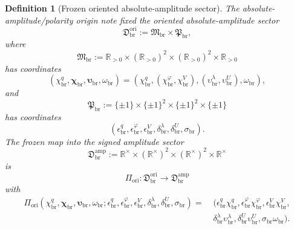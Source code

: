 \documentclass[11pt]{article}
\newcommand{\LiftSector}{\mathfrak D_{\mathrm{br}}^{\mathrm{amp}}}
\newcommand{\OriginSector}{\mathfrak D_{\mathrm{br}}^{\mathrm{ori}}}
\newcommand{\AbsAmpSector}{\mathfrak M_{\mathrm{br}}}
\newcommand{\PolaritySector}{\mathfrak P_{\mathrm{br}}}
\newcommand{\AbsReadAmp}{\chi_{\mathrm{br}}^{q}}
\newcommand{\AbsCovAmp}{\chi_{\mathrm{br}}^{\varphi}}
\newcommand{\AbsRelaxAmp}{\chi_{\mathrm{br}}^{V}}
\newcommand{\AbsKinAmp}{\bm\chi_{\mathrm{br}}}
\newcommand{\AbsWellAmp}{\upsilon_{\mathrm{br}}^{\lambda}}
\newcommand{\AbsEqAmp}{\upsilon_{\mathrm{br}}^{U}}
\newcommand{\AbsAnchorAmp}{\bm\upsilon_{\mathrm{br}}}
\newcommand{\AbsScaleAmp}{\omega_{\mathrm{br}}}
\newcommand{\PolRead}{\epsilon_{\mathrm{br}}^{q}}
\newcommand{\PolCov}{\epsilon_{\mathrm{br}}^{\varphi}}
\newcommand{\PolRelax}{\epsilon_{\mathrm{br}}^{V}}
\newcommand{\PolWell}{\delta_{\mathrm{br}}^{\lambda}}
\newcommand{\PolEq}{\delta_{\mathrm{br}}^{U}}
\newcommand{\PolScale}{\sigma_{\mathrm{br}}}
\newcommand{\OriginMap}{\Pi_{\mathrm{ori}}}
\newcommand{\Rstar}{\mathbb R^{\times}}
\newtheorem{definition}{Definition}
\begin{document}
\begin{definition}[Frozen oriented absolute-amplitude sector]
\label{def:frozenorigin}
The absolute-amplitude/polarity origin note fixed the oriented absolute-amplitude sector
\begin{equation}
\OriginSector
:=
\AbsAmpSector\times\PolaritySector,
\label{eq:originsector}
\end{equation}
where
\begin{equation}
\AbsAmpSector
:=
\mathbb R_{>0}\times(\mathbb R_{>0})^{2}\times(\mathbb R_{>0})^{2}\times\mathbb R_{>0}
\label{eq:abssector}
\end{equation}
has coordinates
\begin{equation}
(\AbsReadAmp,\AbsKinAmp,\AbsAnchorAmp,\AbsScaleAmp)
=
(\AbsReadAmp,(\AbsCovAmp,\AbsRelaxAmp),(\AbsWellAmp,\AbsEqAmp),\AbsScaleAmp),
\label{eq:abscoords}
\end{equation}
and
\begin{equation}
\PolaritySector
:=
\{\pm1\}\times\{\pm1\}^{2}\times\{\pm1\}^{2}\times\{\pm1\}
\label{eq:polsector}
\end{equation}
has coordinates
\begin{equation}
(\PolRead,\PolCov,\PolRelax,\PolWell,\PolEq,\PolScale).
\label{eq:polcoords}
\end{equation}
The frozen map into the signed amplitude sector
\begin{equation}
\LiftSector
:=
\Rstar\times(\Rstar)^{2}\times(\Rstar)^{2}\times\Rstar
\label{eq:liftsector}
\end{equation}
is
\begin{equation}
\OriginMap:\OriginSector\longrightarrow\LiftSector
\label{eq:originmap}
\end{equation}
with
\begin{align}
\OriginMap(\AbsReadAmp,\AbsKinAmp,\AbsAnchorAmp,\AbsScaleAmp;\PolRead,\PolCov,\PolRelax,\PolWell,\PolEq,\PolScale)
=\;&
(\PolRead\AbsReadAmp,\PolCov\AbsCovAmp,\PolRelax\AbsRelaxAmp,
\nonumber\\
&\PolWell\AbsWellAmp,\PolEq\AbsEqAmp,\PolScale\AbsScaleAmp).
\label{eq:originmapexplicit}
\end{align}
\end{definition}
\end{document}
